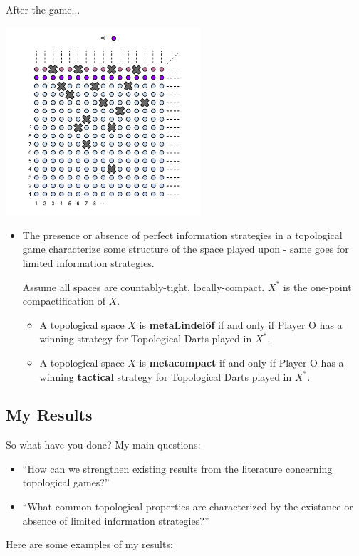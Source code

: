 \documentclass{beamer}
\newcommand{\oneptcomp}[1]{#1^*}
\begin{document}
\begin{frame}
After the game...
\begin{center}
    \includegraphics[height=7cm]{images/topdarts_fan_finale_tactic}
  \end{center}
\end{frame}

\begin{frame}
  \begin{itemize}
    \item
      The presence or absence of perfect information strategies in a topological game characterize some structure of the space played upon - same goes for limited information strategies.

      {\tiny Assume all spaces are countably-tight, locally-compact. $\oneptcomp{X}$ is the one-point compactification of $X$.}
    \pause
    \begin{itemize}
      \item
        A topological space $X$ is \textbf{metaLindel\"of} if and only if Player O has a winning strategy for Topological Darts played in $\oneptcomp{X}$.
      \pause
      \item
        A topological space $X$ is \textbf{metacompact} if and only if Player O has a winning \textbf{tactical} strategy for Topological Darts played in $\oneptcomp{X}$.
    \end{itemize}
  \end{itemize}
\end{frame}

\subsection{My Results}

\begin{frame}{So what have you done?}
My main questions: \pause
  \begin{itemize}
    \item ``How can we strengthen existing results from the literature concerning topological games?''
    \pause
    \item ``What common topological properties are characterized by the existance or absence of limited information strategies?''
  \end{itemize}
\pause
Here are some examples of my results:
\end{frame}
\end{document}
